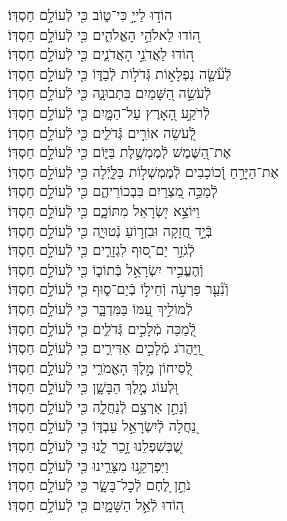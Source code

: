 \documentclass[twoside, openany, parskip=half, 11pt]{book}
\begin{document}
\begin{narrow}
הוֹד֣וּ לַייָ֣ כִּי־ט֑וֹב \hfill
כִּ֖י לְֿעוֹלָ֣ם חַסְדּֽוֹ׃ \\
ה֭וֹדוּ לֵאלֹהֵ֣י הָאֱלֹהִ֑ים \hfill כִּ֖י לְֿעוֹלָ֣ם חַסְדּֽוֹ׃ \\
ה֭וֹדוּ לַאֲדֹנֵ֣י הָאֲדֹנִ֑ים \hfill כִּ֖י לְֿעוֹלָ֣ם חַסְדּֽוֹ׃ \\
לְֿעֹ֘שֵׂ֤ה נִפְלָא֣וֹת גְּֿדֹל֣וֹת לְֿבַדּ֑וֹ \hfill כִּ֖י לְֿעוֹלָ֣ם חַסְדּֽוֹ׃ \\
לְֿעֹשֵׂ֣ה הַ֭שָּׁמַיִם בִּתְבוּנָ֑ה \hfill כִּ֖י לְֿעוֹלָ֣ם חַסְדּֽוֹ׃ \\
לְֿרֹקַ֣ע הָ֭אָרֶץ עַל־הַמָּ֑יִם \hfill כִּ֖י לְֿעוֹלָ֣ם חַסְדּֽוֹ׃ \\
לְֿ֭עֹשֵׂה אוֹרִ֣ים גְּֿדֹלִ֑ים \hfill כִּ֖י לְֿעוֹלָ֣ם חַסְדּֽוֹ׃ \\
אֶת־הַ֭שֶּׁמֶשׁ לְֿמֶמְשֶׁ֣לֶת בַּיּ֑וֹם \hfill כִּ֖י לְֿעוֹלָ֣ם חַסְדּֽוֹ׃ \\
אֶת־הַיָּרֵ֣חַ וְֿ֭כוֹכָבִים לְֿמֶמְשְׁל֣וֹת בַּלָּ֑יְֿלָה \hfill כִּ֖י לְֿעוֹלָ֣ם חַסְדּֽוֹ׃ \\
לְֿמַכֵּ֣ה מִ֭צְרַיִם בִּבְכוֹרֵיהֶ֑ם \hfill כִּ֖י לְֿעוֹלָ֣ם חַסְדּֽוֹ׃ \\
וַיּוֹצֵ֣א יִ֭שְׂרָאֵל מִתּוֹכָ֑ם \hfill כִּ֖י לְֿעוֹלָ֣ם חַסְדּֽוֹ׃ \\
בְּֿיָ֣ד חֲ֭זָקָה וּבִזְר֣וֹעַ נְֿטוּיָ֑ה \hfill כִּ֖י לְֿעוֹלָ֣ם חַסְדּֽוֹ׃ \\
לְֿגֹזֵ֣ר יַם־ס֭וּף לִגְזָרִ֑ים \hfill כִּ֖י לְֿעוֹלָ֣ם חַסְדּֽוֹ׃ \\
וְֿהֶעֱבִ֣יר יִשְׂרָאֵ֣ל בְּֿתוֹכ֑וֹ \hfill כִּ֖י לְֿעוֹלָ֣ם חַסְדּֽוֹ׃ \\
וְֿנִ֘עֵ֤ר פַּרְעֹ֣ה וְֿחֵיל֣וֹ בְֿיַם־ס֑וּף \hfill כִּ֖י לְֿעוֹלָ֣ם חַסְדּֽוֹ׃ \\
לְֿמוֹלִ֣יךְ עַ֭מּוֹ בַּמִּדְבָּ֑ר \hfill כִּ֖י לְֿעוֹלָ֣ם חַסְדּֽוֹ׃ \\
לְֿ֭מַכֵּה מְֿלָכִ֣ים גְּֿדֹלִ֑ים \hfill כִּ֖י לְֿעוֹלָ֣ם חַסְדּֽוֹ׃ \\
וַֽ֭יַּהֲרֹג מְֿלָכִ֣ים אַדִּירִ֑ים \hfill כִּ֖י לְֿעוֹלָ֣ם חַסְדּֽוֹ׃ \\
לְֿ֭סִיחוֹן מֶ֣לֶךְ הָאֱמֹרִ֑י \hfill כִּ֖י לְֿעוֹלָ֣ם חַסְדּֽוֹ׃ \\
וּ֭לְעוֹג מֶ֣לֶךְ הַבָּשָׁ֑ן \hfill כִּ֖י לְֿעוֹלָ֣ם חַסְדּֽוֹ׃ \\
וְֿנָתַ֣ן אַרְצָ֣ם לְֿנַחֲלָ֑ה \hfill כִּ֖י לְֿעוֹלָ֣ם חַסְדּֽוֹ׃ \\
נַ֭חֲלָה לְֿיִשְׂרָאֵ֣ל עַבְדּ֑וֹ \hfill כִּ֖י לְֿעוֹלָ֣ם חַסְדּֽוֹ׃ \\
שֶׁ֭בְּשִׁפְלֵנוּ זָ֣כַר לָ֑נוּ \hfill כִּ֖י לְֿעוֹלָ֣ם חַסְדּֽוֹ׃ \\
וַיִּפְרְקֵ֥נוּ מִצָּרֵ֑ינוּ \hfill כִּ֖י לְֿעוֹלָ֣ם חַסְדּֽוֹ׃ \\
נֹתֵ֣ן לֶ֭חֶם לְֿכׇל־בָּשָׂ֑ר \hfill כִּ֖י לְֿעוֹלָ֣ם חַסְדּֽוֹ׃ \\
ה֭וֹדוּ לְֿאֵ֣ל הַשָּׁמָ֑יִם \hfill כִּ֖י לְֿעוֹלָ֣ם חַסְדּֽוֹ׃ \\




\end{narrow}
\end{document}
